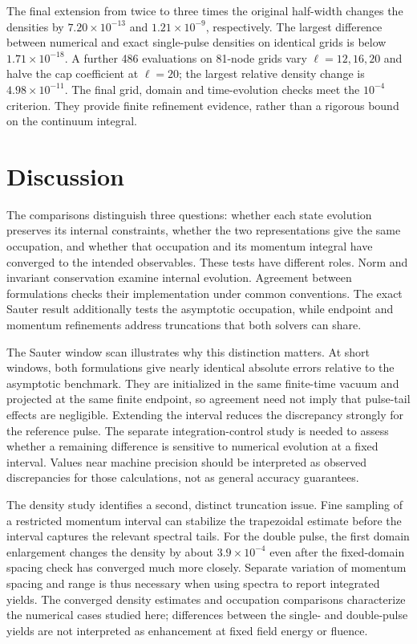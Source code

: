 \documentclass[anonymous]{iopjournal}
\begin{document}
The final extension from twice to three times the original half-width changes the densities by $7.20\times10^{-13}$ and $1.21\times10^{-9}$, respectively. The largest difference between numerical and exact single-pulse densities on identical grids is below $1.71\times10^{-18}$. A further 486 evaluations on 81-node grids vary $\ell=12,16,20$ and halve the cap coefficient at $\ell=20$; the largest relative density change is $4.98\times10^{-11}$. The final grid, domain and time-evolution checks meet the $10^{-4}$ criterion. They provide finite refinement evidence, rather than a rigorous bound on the continuum integral.

\FloatBarrier
\section{Discussion}
\label{sec:discussion}

The comparisons distinguish three questions: whether each state evolution preserves its internal constraints, whether the two representations give the same occupation, and whether that occupation and its momentum integral have converged to the intended observables. These tests have different roles. Norm and invariant conservation examine internal evolution. Agreement between formulations checks their implementation under common conventions. The exact Sauter result additionally tests the asymptotic occupation, while endpoint and momentum refinements address truncations that both solvers can share.

The Sauter window scan illustrates why this distinction matters. At short windows, both formulations give nearly identical absolute errors relative to the asymptotic benchmark. They are initialized in the same finite-time vacuum and projected at the same finite endpoint, so agreement need not imply that pulse-tail effects are negligible. Extending the interval reduces the discrepancy strongly for the reference pulse. The separate integration-control study is needed to assess whether a remaining difference is sensitive to numerical evolution at a fixed interval. Values near machine precision should be interpreted as observed discrepancies for those calculations, not as general accuracy guarantees.

The density study identifies a second, distinct truncation issue. Fine sampling of a restricted momentum interval can stabilize the trapezoidal estimate before the interval captures the relevant spectral tails. For the double pulse, the first domain enlargement changes the density by about $3.9\times10^{-4}$ even after the fixed-domain spacing check has converged much more closely. Separate variation of momentum spacing and range is thus necessary when using spectra to report integrated yields. The converged density estimates and occupation comparisons characterize the numerical cases studied here; differences between the single- and double-pulse yields are not interpreted as enhancement at fixed field energy or fluence.
\end{document}
